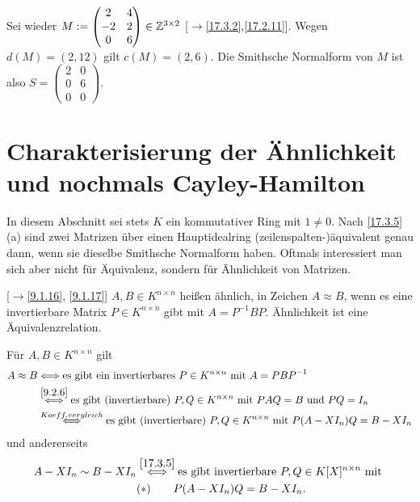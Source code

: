\documentclass[../../main.tex]{subfiles}
\begin{document}
\begin{bsp}\label{17.3.8}
    Sei wieder $M:=\begin{pmatrix}2 & 4\\ -2&2\\ 0&6\end{pmatrix}\in \mathbb Z^{3\times 2}$ [$\to$\ref{17.3.2},\ref{17.2.11}]. Wegen $d(M)=(2,12)$ gilt $c(M)=(2,6)$. Die Smithsche Normalform von $M$ ist also $S=\begin{pmatrix}2 & 0\\ 0 & 6\\ 0&0\end{pmatrix}$.
\end{bsp}

\section{Charakterisierung der Ähnlichkeit und nochmals Cayley-Hamilton}

In diesem Abschnitt sei stets $K$ ein kommutativer Ring mit $1\neq 0$. Nach \ref{17.3.5}(a) sind zwei Matrizen über einen Hauptidealring (zeilenspalten-)äquivalent genau dann, wenn sie dieselbe Smithsche Normalform haben. Oftmals interessiert man sich aber nicht für Äquivalenz, sondern für Ähnlichkeit von Matrizen.

\begin{er}\mbox{}[$\to$\ref{9.1.16}, \ref{9.1.17}]\label{17.4.1}
    $A,B\in K^{n\times n}$ heißen ähnlich, in Zeichen $A\approx B$, wenn es eine invertierbare Matrix $P\in K^{n\times n}$ gibt mit $A=P^{-1}BP$. Ähnlichkeit ist eine Äquivalenzrelation.
\end{er}

\begin{beo}\label{17.4.2}
    Für $A,B\in K^{n\times n}$ gilt
    \begin{align*}
        A\approx B&\Longleftrightarrow\text{es gibt ein invertierbares }P\in K^{n\times n}\text{ mit }A=PBP^{-1}\\
        &\stackrel{\ref{9.2.6}}{\Longleftrightarrow}\text{es gibt (invertierbare) }P,Q\in K^{n\times n}\text{ mit }PAQ=B\text{ und }PQ=I_n\\
        &\stackrel{\footnotesize{Koeff.vergleich}}{\Longleftrightarrow}\text{es gibt (invertierbare) }P,Q\in K^{n\times n}\text{ mit }P(A-XI_n)Q=B-XI_n
    \end{align*}
    und andererseits
    \begin{align*}
        A-XI_n\sim B-XI_n&\stackrel{\ref{17.3.5}}{\Longleftrightarrow}\text{es gibt invertierbare }P,Q\in K[X]^{n\times n}\text{ mit }\\
        &(*)\qquad P(A-XI_n)Q=B-XI_n.
    \end{align*}
\end{beo}
\end{document}
